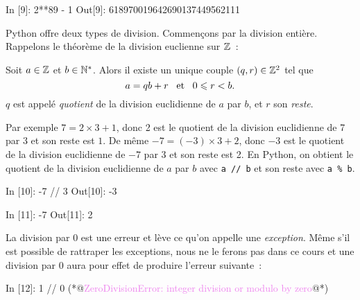 \documentclass{magnolia}
\begin{document}
\begin{pythoncode}
In [9]: 2**89 - 1
Out[9]: 618970019642690137449562111
\end{pythoncode}
\vspace{1ex}

Python offre deux types de division. Commençons par la division entière. Rappelons le théorème de la division euclienne sur $\mathbb{Z}$~:

\begin{proposition}
Soit $a\in\mathbb{Z}$ et $b\in{\mathbb{N}^*}$. Alors il existe un unique couple $\left(q,r\right)\in\mathbb{Z}^2$
tel que
\[a=qb+r \quad\!\text{et}\quad\! 0\leqslant r<b.\]
$q$ est appelé \emph{quotient} de la division euclidienne de $a$ par $b$, et $r$ son
\emph{reste}.
\end{proposition}

\noindent
Par exemple $7 = 2\times 3 + 1$, donc 2 est le quotient de la division
euclidienne de 7 par 3 et son reste est $1$. De même $-7 = (-3)\times 3 + 2$, donc $-3$ est
le quotient de la division euclidienne de $-7$ par 3 et son reste est 2. En Python,
on obtient le quotient de la division euclidienne de $a$ par $b$ avec
\verb_a // b_ et son reste avec \verb_a % b_.

\begin{pythoncode}
In [10]: -7 // 3
Out[10]: -3

In [11]: -7 %
Out[11]: 2
\end{pythoncode}

\noindent La division par 0 est une erreur et lève ce
qu'on appelle une \emph{exception}. Même s'il est possible de rattraper les exceptions,
nous ne le ferons pas dans ce cours et une division par 0 aura pour effet de produire
l'erreur suivante~:

\begin{francois}
\begin{pythoncode}
In [12]: 1 // 0
(*@\textcolor{violet}{ZeroDivisionError: integer division or modulo by zero}@*)
\end{pythoncode}
\end{francois}


\vspace{1ex}
\end{document}
